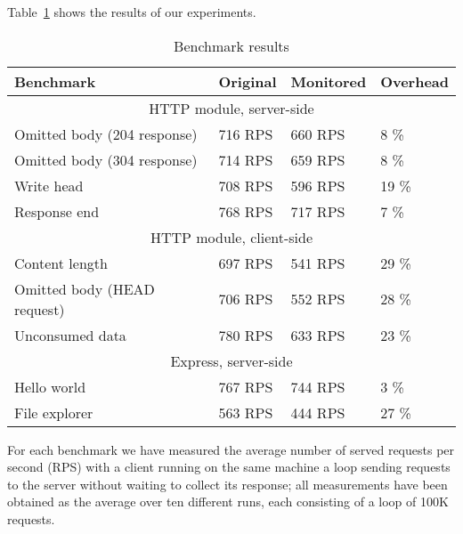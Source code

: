 Table~\ref{table} shows the results of our experiments. 
\begin{table}[ht]
  \begin{tabular}{|l|l|l|l|}
    \hline
    \textbf{Benchmark} & 
    \textbf{Original} &
    \textbf{Monitored} &
    \textbf{Overhead} \\
    \hline
    \multicolumn{4}{|c|}{HTTP module, server-side}\\
    \hline

    Omitted body (204 response)&
    716 RPS &
    660 RPS &
    8 \% \\

    Omitted body (304 response)&
    714 RPS &
    659 RPS &
    8 \% \\

    Write head &
    708 RPS &
    596 RPS &
    19 \% \\

    Response end &
    768 RPS &
    717 RPS &
    7 \% \\

    \hline

    \multicolumn{4}{|c|}{HTTP module, client-side}\\
    \hline

    Content length & 
    697 RPS &
    541 RPS &
    29 \% \\

    Omitted body (HEAD request)&
    706 RPS &
    552 RPS &
    28 \% \\

    Unconsumed data &
     780 RPS &
     633 RPS &
     23 \% \\

     \hline
    \multicolumn{4}{|c|}{Express, server-side}\\
    \hline
    Hello world & 
    767 RPS &
    744 RPS &
    3 \% \\

    File explorer &
    563 RPS &
    444 RPS &
    27 \%\\

    \hline
  \end{tabular}
  \caption{Benchmark results}
  \label{table}
\end{table}
For each benchmark we have measured the average number of served requests per second (RPS) 
with a client running on the same machine a loop sending requests to the server without waiting to collect its response;
all measurements have been obtained as the average over ten different runs, each consisting
of a loop of 100K requests.

